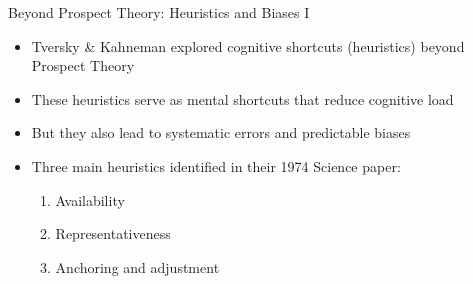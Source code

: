 \documentclass[10pt,handout]{beamer}
\begin{document}

\begin{frame}{Beyond Prospect Theory: Heuristics and Biases I}
  \begin{itemize}[<+->]
    \item Tversky \& Kahneman explored cognitive shortcuts (heuristics) beyond Prospect Theory
    \item These heuristics serve as mental shortcuts that reduce cognitive load
    \item But they also lead to systematic errors and predictable biases
    \item Three main heuristics identified in their 1974 Science paper:
      \begin{enumerate}
        \item Availability
        \item Representativeness 
        \item Anchoring and adjustment
      \end{enumerate}
  \end{itemize}
\end{frame}
\end{document}
